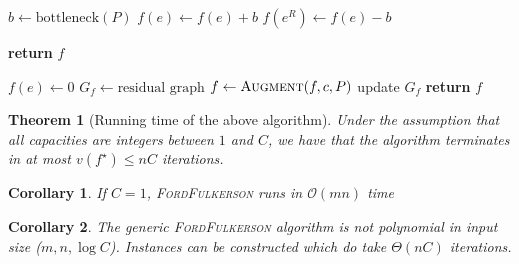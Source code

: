 \documentclass[10pt, oneside, reqno]{amsart}
\theoremstyle{plain}%
\newtheorem{thm}{Theorem}[section]
\newtheorem*{cor}{Corollary}
\theoremstyle{definition}
\theoremstyle{remark}
\newcommand{\bigo}[1]{\mathcal{O}(#1)}
\begin{document}
    \begin{algorithm}[H]
        \label{alg:dynamic_rising_trend}
        \caption{Augments a path \textbf{P}}
        \begin{algorithmic}[1]
            \State $b \leftarrow \text{bottleneck}(P)$          
                  $f(e) \leftarrow f(e) + b$
                \Else{}  $f(e^R) \leftarrow f(e) - b$
                \EndIf
            \EndFor
            
            \State \textbf{return} $f$
        \EndProcedure
        \end{algorithmic}
    \end{algorithm}


\begin{algorithm}[H]
    \label{alg:dynamic_rising_trend}
    \caption{Finds the maximum flow}
    \begin{algorithmic}[1]

         $f(e) \leftarrow 0$
        \EndFor
        \State $G_f \leftarrow \text{residual graph}$
            \State $f \leftarrow \textsc{Augment}(f, c, P)$
            \State update $G_f$
        \EndWhile
        \State \textbf{return} $f$
    \EndProcedure
    \end{algorithmic}
\end{algorithm}


\begin{thm}[Running time of the above algorithm]
    Under the assumption that all capacities are integers between $1$ and $C$, we have that the algorithm terminates in at most $v(f^\star) \leq nC$ iterations.   
\end{thm}

\begin{cor}
    If $C = 1$, \textsc{FordFulkerson} runs in $\bigo{mn}$ time
\end{cor}


\begin{cor}
    The generic \textsc{FordFulkerson} algorithm is not polynomial in input size ($m,n, \log C$). Instances can be constructed which do take $\Theta(nC)$ iterations.
\end{cor}
\end{document}

